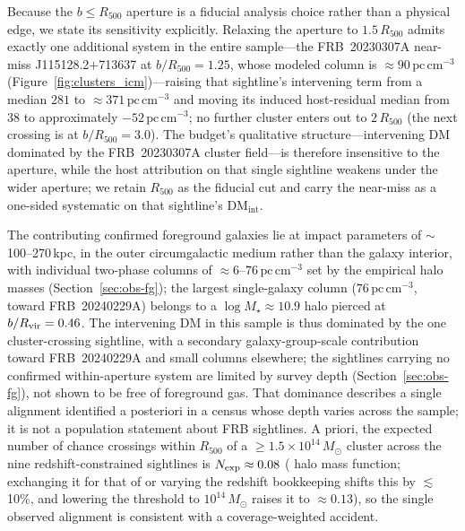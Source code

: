 Because the $b\le R_{500}$ aperture is a fiducial analysis choice rather
than a physical edge, we state its sensitivity explicitly. Relaxing the
aperture to $1.5\,R_{500}$ admits exactly one additional system in the
entire sample---the FRB~20230307A near-miss J115128.2$+$713637 at
$b/R_{500}=1.25$, whose modeled column is $\approx90\,\mathrm{pc\,cm^{-3}}$
(Figure~\ref{fig:clusters_icm})---raising that sightline's intervening term
from a median $281$ to $\approx371\,\mathrm{pc\,cm^{-3}}$ and moving its induced
host-residual median from $38$ to approximately
$-52\,\mathrm{pc\,cm^{-3}}$; no further
cluster enters out to $2\,R_{500}$ (the next crossing is at
$b/R_{500}=3.0$). The budget's qualitative structure---intervening DM
dominated by the FRB~20230307A cluster field---is therefore insensitive to
the aperture, while the host attribution on that single sightline weakens
under the wider aperture; we retain $R_{500}$ as the fiducial cut and carry
the near-miss as a one-sided systematic on that sightline's
$\mathrm{DM_{int}}$.

The contributing confirmed foreground galaxies lie at impact parameters of
$\sim$100--270\,kpc, in the outer circumgalactic medium rather than the galaxy
interior, with individual two-phase columns of
$\approx6$--$76\,\mathrm{pc\,cm^{-3}}$ set by the empirical halo masses
(Section~\ref{sec:obs-fg}); the largest single-galaxy column
($76\,\mathrm{pc\,cm^{-3}}$, toward FRB~20240229A) belongs to a
$\log M_\star\approx10.9$ halo pierced at $b/R_{\rm vir}=0.46$.
The intervening DM in this sample is thus dominated by the one
cluster-crossing sightline, with a secondary galaxy-group-scale contribution
toward FRB~20240229A and small columns elsewhere; the sightlines
carrying no confirmed within-aperture system are limited by survey depth
(Section~\ref{sec:obs-fg}), not shown to be free of foreground gas. That
dominance describes a single alignment identified a posteriori in a census
whose depth varies across the sample; it is not a population statement about
FRB sightlines. A priori, the expected number of chance crossings within
$R_{500}$ of a $\ge1.5\times10^{14}\,M_\odot$ cluster across the nine
redshift-constrained sightlines is $N_{\rm exp}\approx0.08$
(\citealt{Tinker2008} halo mass function; exchanging it for that of
\citealt{Despali2016} or varying the redshift bookkeeping shifts this by
$\lesssim$10\%, and lowering the threshold to $10^{14}\,M_\odot$ raises it to
$\approx0.13$), so the single observed alignment is consistent with a
coverage-weighted accident.

